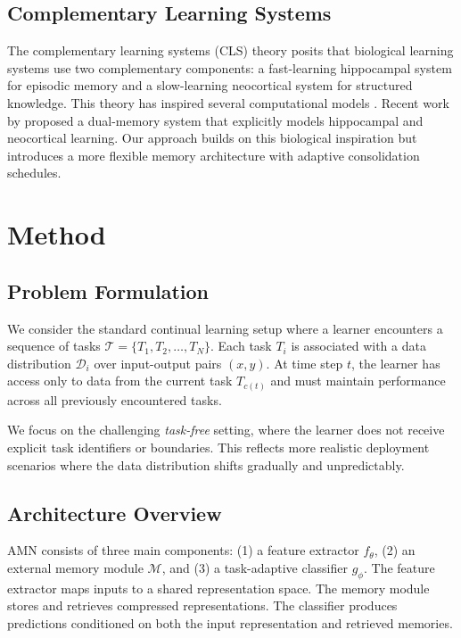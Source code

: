 \documentclass[11pt]{article}
\begin{document}
\subsection{Complementary Learning Systems}

The complementary learning systems (CLS) theory \citep{mcclelland1995there} posits that biological learning systems use two complementary components: a fast-learning hippocampal system for episodic memory and a slow-learning neocortical system for structured knowledge. This theory has inspired several computational models \citep{kumaran2016learning, zenke2017continual}. Recent work by \citet{arani2022learning} proposed a dual-memory system that explicitly models hippocampal and neocortical learning. Our approach builds on this biological inspiration but introduces a more flexible memory architecture with adaptive consolidation schedules.

\section{Method}
\label{sec:method}

\subsection{Problem Formulation}

We consider the standard continual learning setup where a learner encounters a sequence of tasks $\mathcal{T} = \{T_1, T_2, \ldots, T_N\}$. Each task $T_i$ is associated with a data distribution $\mathcal{D}_i$ over input-output pairs $(x, y)$. At time step $t$, the learner has access only to data from the current task $T_{c(t)}$ and must maintain performance across all previously encountered tasks.

We focus on the challenging \emph{task-free} setting, where the learner does not receive explicit task identifiers or boundaries. This reflects more realistic deployment scenarios where the data distribution shifts gradually and unpredictably.

\subsection{Architecture Overview}

AMN consists of three main components: (1) a feature extractor $f_\theta$, (2) an external memory module $\mathcal{M}$, and (3) a task-adaptive classifier $g_\phi$. The feature extractor maps inputs to a shared representation space. The memory module stores and retrieves compressed representations. The classifier produces predictions conditioned on both the input representation and retrieved memories.
\end{document}
